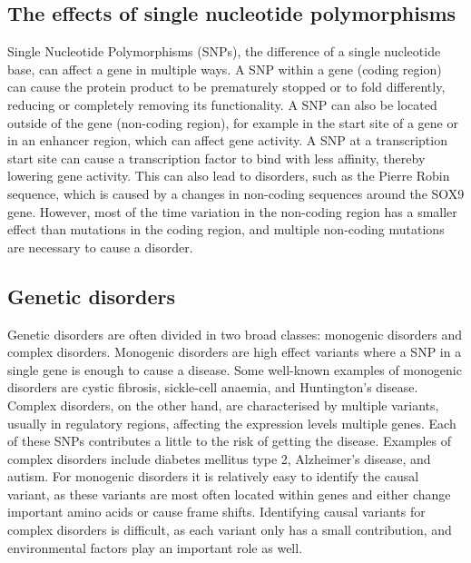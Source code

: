 \subsection{The effects of single nucleotide polymorphisms}
Single Nucleotide Polymorphisms (SNPs), the difference of a single nucleotide base, can affect a gene in multiple ways. A SNP within a gene (coding region) can cause the protein product to be prematurely stopped\cite{deboeverMedicalRelevanceProteintruncating2018} or to fold differently\cite{vihinenTypesEffectsProtein2015}, reducing or completely removing its functionality. A SNP can also be located outside of the gene (non-coding region), for example in the start site of a gene or in an enhancer region, which can affect gene activity. A SNP at a transcription start site can cause a transcription factor to bind with less affinity, thereby lowering gene activity. This can also lead to disorders, such as the Pierre Robin sequence, which is caused by a changes in non-coding sequences around the SOX9 gene\cite{benkoHighlyConservedNoncoding2009}. However, most of the time variation in the non-coding region has a smaller effect than mutations in the coding region, and multiple non-coding mutations are necessary to cause a disorder.

\subsection{Genetic disorders}
Genetic disorders are often divided in two broad classes: monogenic disorders\cite{heidiRareGeneticDisorders2008} and complex disorders\cite{craigComplexDiseasesResearch2008}. Monogenic disorders are high effect variants where a SNP in a single gene is enough to cause a disease. Some well-known examples of monogenic disorders are cystic fibrosis\cite{keremIdentificationCysticFibrosis1989}, sickle-cell anaemia\cite{neelInheritanceSickleCell1949}, and Huntington's disease\cite{gusellaPolymorphicDNAMarker1983}. Complex disorders, on the other hand, are characterised by multiple variants, usually in regulatory regions, affecting the expression levels multiple genes. Each of these SNPs contributes a little to the risk of getting the disease. Examples of complex disorders include diabetes mellitus type 2\cite{americandiabetesassociationDiagnosisClassificationDiabetes2007}, Alzheimer's disease\cite{hardyAlzheimerDiseaseAmyloid1992}, and autism\cite{PolygenicTransmissionDisequilibrium}. For monogenic disorders it is relatively easy to identify the causal variant, as these variants are most often located within genes and either change important amino acids or cause frame shifts. Identifying causal variants for complex disorders is difficult, as each variant only has a small contribution, and environmental factors play an important role as well. 

